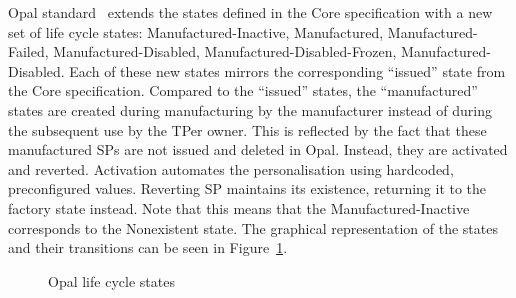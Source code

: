 Opal standard~\cite{tcg-opal2} extends the states defined in the Core specification with a new set of life cycle states: Manufactured-Inactive, Manufactured, Manufactured-Failed, Manufactured-Disabled, Manufactured-Disabled-Frozen, Manufactured-Disabled. Each of these new states mirrors the corresponding ``issued'' state from the Core specification. Compared to the ``issued'' states, the ``manufactured'' states are created during manufacturing by the manufacturer instead of during the subsequent use by the TPer owner. This is reflected by the fact that these manufactured SPs are not issued and deleted in Opal. Instead, they are activated and reverted. Activation automates the personalisation using hardcoded, preconfigured values. Reverting SP maintains its existence, returning it to the factory state instead. Note that this means that the Manufactured-Inactive corresponds to the Nonexistent state. The graphical representation of the states and their transitions can be seen in Figure~\ref{fig:life_cycle_opal}.


\begin{figure}
    \centering






    \caption{Opal life cycle states~\cite{tcg-opal2}}
    \label{fig:life_cycle_opal}
\end{figure}

